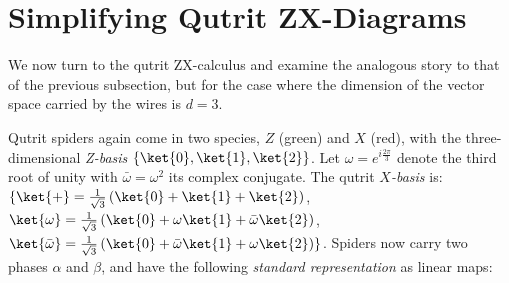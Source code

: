 \section{Simplifying Qutrit ZX-Diagrams}\label{sec:qutrits}

We now turn to the qutrit ZX-calculus and examine the analogous story to that of the previous subsection,
but for the case where the dimension of the vector space carried by the wires is $d=3$.

Qutrit spiders again come in two species,
$Z$ (green) and $X$ (red),
with the three-dimensional \emph{Z-basis} $\{\ket{0},\ket{1},\ket{2}\}$.
Let $\omega = e^{i \frac{2\pi}{3}}$ denote the third root of unity
with $\bar\omega = \omega^2$ its complex conjugate.
The qutrit \emph{$X$-basis} is:
$\{ \ket{+} = \frac{1}{\sqrt{3}} \left(\ket{0} + \ket{1} + \ket{2}\right)$,
$\ket{\omega} = \frac{1}{\sqrt{3}} \left(\ket{0} + \omega\ket{1} + \bar{\omega}\ket{2}\right)$,
$\ket{\bar{\omega}} = \frac{1}{\sqrt{3}} \left(\ket{0} + \bar{\omega}\ket{1} + \omega\ket{2}\right) \} $.
Spiders now carry two phases $\alpha$ and $\beta$,
and have the following \emph{standard representation} as linear maps:
\begingroup
	\allowdisplaybreaks
	\setlength{\jot}{5pt}
